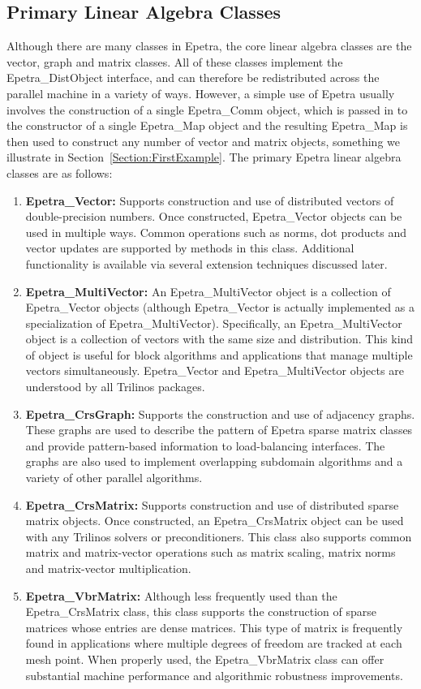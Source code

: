 \documentclass[12pt,relax]{EpetraUserGuide}
\newcommand{\comm}{Epetra\_Comm}
\newcommand{\map}{Epetra\_Map}
\renewcommand{\vector}{Epetra\_Vector}
\newcommand{\multivector}{Epetra\_MultiVector}
\newcommand{\crsgraph}{Epetra\_CrsGraph}
\newcommand{\crsmatrix}{Epetra\_CrsMatrix}
\newcommand{\vbrmatrix}{Epetra\_VbrMatrix}
\newcommand{\distobject}{Epetra\_DistObject}
\begin{document}
\subsection{Primary Linear Algebra Classes}
Although there are many classes in Epetra, the core linear algebra classes are the
vector, graph and matrix classes.  All of these classes implement the
\distobject{} interface, and can therefore be redistributed across the
parallel machine in a variety of ways.  However, a simple use of Epetra usually
involves the construction of a single \comm{} object, which is passed
in to the constructor of a single \map{} object and the resulting \map{}
is then used to construct any number of vector and matrix objects,
something we illustrate in Section~\ref{Section:FirstExample}.
The primary Epetra linear algebra classes are as follows:
\begin{enumerate}
\item {\bf \vector{}: } Supports construction and use of distributed
vectors of double-precision numbers.  Once constructed, \vector{}
objects can be used in multiple ways.  Common operations such as
norms, dot products and vector updates are supported by methods in
this class.  Additional functionality is available via several
extension techniques discussed later.
\item{\bf \multivector{}: } An \multivector{} object is a collection
of \vector{} objects (although \vector{} is actually implemented as a
specialization of \multivector{}).  Specifically, an \multivector{}
object is a collection of vectors with the same size and
distribution.  This kind of object is useful for block algorithms and
applications that manage multiple vectors simultaneously.  \vector{}
and \multivector{} objects are understood by all Trilinos packages.
\item{\bf \crsgraph{}:} Supports the construction and use of adjacency
graphs.  These graphs are used to describe the pattern of Epetra
sparse matrix classes and provide pattern-based information to
load-balancing interfaces.  The graphs are also used to implement
overlapping subdomain algorithms and a variety of other parallel
algorithms.
\item{\bf \crsmatrix{}:} Supports construction and use of distributed
sparse matrix objects.  Once constructed, an \crsmatrix{} object can
be used with any Trilinos solvers or preconditioners.  This class also
supports common matrix and matrix-vector operations such as matrix
scaling, matrix norms and matrix-vector multiplication.
\item{\bf \vbrmatrix{}:} Although less frequently used than the
\crsmatrix{} class, this class supports the construction of sparse
matrices whose entries are dense matrices.  This type of matrix is
frequently found in applications where multiple degrees of freedom are
tracked at each mesh point.  When properly used, the \vbrmatrix{}
class can offer substantial machine performance and algorithmic
robustness improvements.

\end{enumerate}
\end{document}
